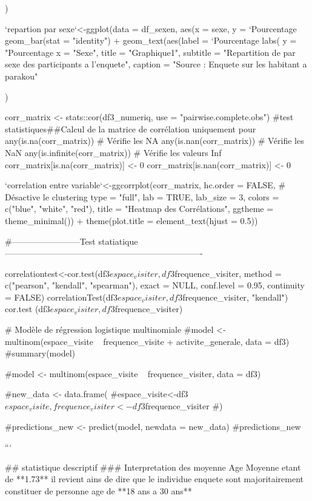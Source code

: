   )

`repartion par sexe`<-ggplot(data = df_sexen, aes(x = sexe, y = `Pourcentage%
  geom_bar(stat = "identity") +
  geom_text(aes(label = `Pourcentage%
  labs(
    y = "Pourcentage %
    x = "Sexe",
    title = "Graphique1",
    subtitle = "Repartition de par sexe des participants a l'enquete",
    caption = "Source : Enquete sur les habitant a parakou"
    
  )

corr_matrix <- stats::cor(df3_numeriq, use = "pairwise.complete.obs") #test statistiques##Calcul de la matrice de corrélation uniquement pour any(is.na(corr_matrix))  # Vérifie les NA
any(is.nan(corr_matrix)) # Vérifie les NaN
any(is.infinite(corr_matrix)) # Vérifie les valeurs Inf
corr_matrix[is.na(corr_matrix)] <- 0
corr_matrix[is.nan(corr_matrix)] <- 0

`correlation entre variable`<-ggcorrplot(corr_matrix, 
           hc.order = FALSE, # Désactive le clustering
           type = "full", 
           lab = TRUE,
           lab_size = 3,
           colors = c("blue", "white", "red"),
           title = "Heatmap des Corrélations",
           ggtheme = theme_minimal()) +
  theme(plot.title = element_text(hjust = 0.5))



#------------------------Test statiatique----------------------------------------------------------------------

correlationtest<-cor.test(df3$espace_visiter, df3$frequence_visiter,
         method = c("pearson", "kendall", "spearman"),
         exact = NULL, conf.level = 0.95, continuity = FALSE)
correlationTest(df3$espace_visiter,df3$frequence_visiter, "kendall")
cor.test (df3$espace_visiter,df3$frequence_visiter)


# Modèle de régression logistique multinomiale
#model <- multinom(espace_visite ~ frequence_visite + activite_generale, data = df3)
#summary(model)

#model <- multinom(espace_visite ~ frequence_visiter, data = df3)

#new_data <- data.frame(
#espace_visite<-df3$espace_visite,frequence_visiter<-df3$frequence_visiter
#)

#predictions_new <- predict(model, newdata = new_data)
#predictions_new

```

## statistique descriptif
### Interpretation des moyenne Age
Moyenne etant de **1.73** il revient ains de dire que le individue enquete sont majoritairement constituer de personne age de **18 ans a 30 ans** 

